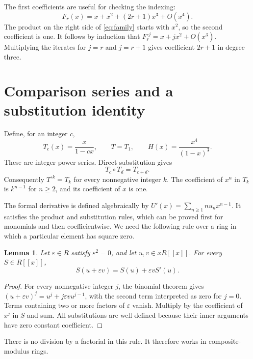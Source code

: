\documentclass[11pt,a4paper]{article}
\newtheorem{lemma}[theorem]{Lemma}
\theoremstyle{remark}\newtheorem{remark}[theorem]{Remark}
\begin{document}
The first coefficients are useful for checking the indexing:
\begin{equation}\label{eq:firstcoeff}
F_r(x)=x+x^2+(2r+1)x^3+O(x^4).
\end{equation}
The product on the right side of \eqref{eq:family} starts with $x^2$,
so the second coefficient is one. It follows by induction that
$F_r^{\circ j}=x+jx^2+O(x^3)$. Multiplying the iterates for $j=r$
and $j=r+1$ gives coefficient $2r+1$ in degree three.

\section{Comparison series and a substitution identity}

Define, for an integer $c$,
\begin{equation}\label{eq:tH}
T_c(x)=\frac{x}{1-cx},\qquad T=T_1,\qquad
H(x)=\frac{x^4}{(1-x)^3}.
\end{equation}
These are integer power series. Direct substitution gives
\begin{equation}\label{eq:t-group}
T_c\circ T_d=T_{c+d}.
\end{equation}
Consequently $T^{\circ k}=T_k$ for every nonnegative integer $k$.
The coefficient of $x^n$ in $T_k$ is $k^{n-1}$ for $n\ge2$,
and its coefficient of $x$ is one.

The formal derivative is defined algebraically by
$U'(x)=\sum_{n\ge1}nu_nx^{n-1}$. It satisfies the product and
substitution rules, which can be proved first for monomials and then
coefficientwise. We need the following rule over a ring in which a
particular element has square zero.

\begin{lemma}\label{lem:taylor}
Let $\varepsilon\in R$ satisfy $\varepsilon^2=0$, and let
$u,v\in xR[[x]]$. For every $S\in R[[x]]$,
\[
S(u+\varepsilon v)=S(u)+\varepsilon vS'(u).
\]
\end{lemma}

\begin{proof}
For every nonnegative integer $j$, the binomial theorem gives
$(u+\varepsilon v)^j=u^j+j\varepsilon vu^{j-1}$, with the second
term interpreted as zero for $j=0$. Terms containing two or more
factors of $\varepsilon$ vanish. Multiply by the coefficient of
$x^j$ in $S$ and sum. All substitutions are well defined because
their inner arguments have zero constant coefficient.
\end{proof}

There is no division by a factorial in this rule. It therefore works
in composite-modulus rings.
\end{document}
